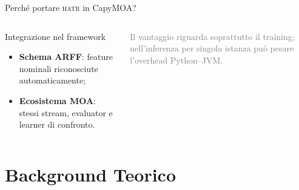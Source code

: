\documentclass[aspectratio=169,10pt]{beamer}
\newcommand{\hatr}{\textsc{hatr}}
\begin{document}
\begin{frame}{Perché portare \hatr{} in CapyMOA?}
\begin{columns}[T]
    \begin{block}{Integrazione nel framework}
      \small
      \begin{itemize}
        \item \textbf{Schema ARFF}: feature nominali riconosciute
              automaticamente;
        \item \textbf{Ecosistema MOA}: stessi stream, evaluator e learner
              di confronto.
      \end{itemize}
    \end{block}

    \vspace{1pt}
    {\scriptsize\textcolor{gray}{Il vantaggio riguarda soprattutto il training;
    nell'inferenza per singola istanza può pesare l'overhead Python--JVM.}}
  \end{columns}
\end{frame}

\section{Background Teorico}
\end{document}
